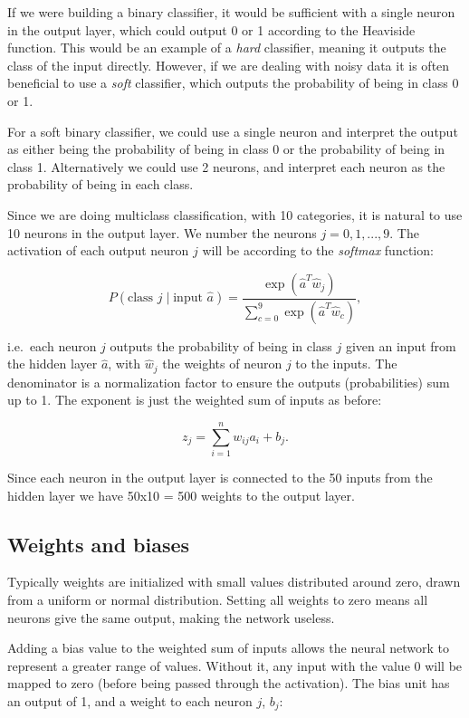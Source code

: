 \documentclass[%
oneside,                 %
final,                   %
10pt]{article}
\begin{document}
\noindent
If we were building a binary classifier, it would be sufficient with a single neuron in the output layer,
which could output 0 or 1 according to the Heaviside function. This would be an example of a \emph{hard} classifier, meaning it outputs the class of the input directly. However, if we are dealing with noisy data it is often beneficial to use a \emph{soft} classifier, which outputs the probability of being in class 0 or 1.  

For a soft binary classifier, we could use a single neuron and interpret the output as either being the probability of being in class 0 or the probability of being in class 1. Alternatively we could use 2 neurons, and interpret each neuron as the probability of being in each class.  

Since we are doing multiclass classification, with 10 categories, it is natural to use 10 neurons in the output layer. We number the neurons $j = 0,1,...,9$. The activation of each output neuron $j$ will be according to the \emph{softmax} function:  

$$ P(\text{class $j$} \mid \text{input $\hat{a}$}) = \frac{\exp{(\hat{a}^T \hat{w}_j)}}
{\sum_{c=0}^{9} \exp{(\hat{a}^T \hat{w}_c)}} ,$$  

i.e.~each neuron $j$ outputs the probability of being in class $j$ given an input from the hidden layer $\hat{a}$, with $\hat{w}_j$ the weights of neuron $j$ to the inputs.  
The denominator is a normalization factor to ensure the outputs (probabilities) sum up to 1.  
The exponent is just the weighted sum of inputs as before:  

$$ z_j = \sum_{i=1}^n w_ {ij} a_i+b_j.$$  

Since each neuron in the output layer is connected to the 50 inputs from the hidden layer we have 50x10 = 500
weights to the output layer.

\subsection*{Weights and biases}

Typically weights are initialized with small values distributed around zero, drawn from a uniform
or normal distribution. Setting all weights to zero means all neurons give the same output, making the network useless.  

Adding a bias value to the weighted sum of inputs allows the neural network to represent a greater range
of values. Without it, any input with the value 0 will be mapped to zero (before being passed through the activation). The bias unit has an output of 1, and a weight to each neuron $j$, $b_j$:  
\end{document}
